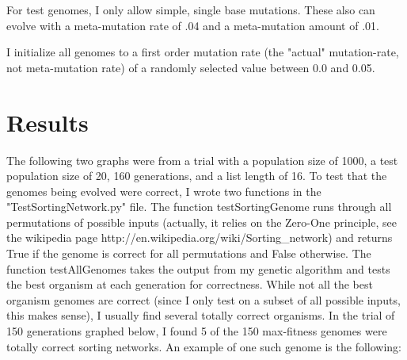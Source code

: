 \documentclass[9pt]{article}
\begin{document}
For test genomes, I only allow simple, single base mutations. These also can evolve with a meta-mutation rate of .04 and a meta-mutation amount of .01. 

I initialize all genomes to a first order mutation rate (the "actual" mutation-rate, not meta-mutation rate) of a randomly selected value between 0.0 and 0.05. 

\vspace{5mm}


\section{Results}  
  
The following two graphs were from a trial with a population size of 1000, a test population size of 20, 160 generations, and a list length of 16. To test that the genomes being evolved were correct, I wrote two functions in the "TestSortingNetwork.py" file. The function testSortingGenome runs through all permutations of possible inputs (actually, it relies on the Zero-One principle, see the wikipedia page http://en.wikipedia.org/wiki/Sorting\_network) and returns True if the genome is correct for all permutations and False otherwise. The function testAllGenomes takes the output from my genetic algorithm and tests the best organism at each generation for correctness. While not all the best organism genomes are correct (since I only test on a subset of all possible inputs, this makes sense), I usually find several totally correct organisms. In the trial of 150 generations graphed below, I found 5 of the 150 max-fitness genomes were totally correct sorting networks. An example of one such genome is the following: 
\end{document}
